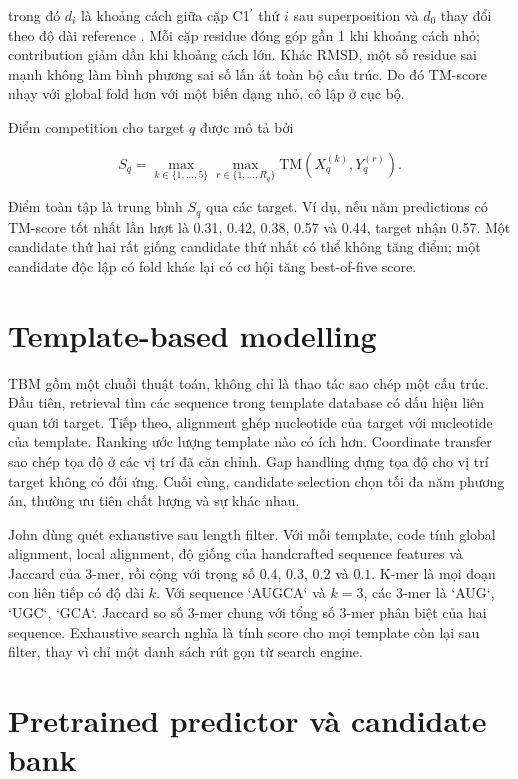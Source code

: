 \documentclass[12pt,a4paper,oneside]{report}
\newcommand{\cprime}{C1$^{\prime}$}
\begin{document}
trong đó $d_i$ là khoảng cách giữa cặp \cprime{} thứ $i$ sau superposition và
$d_0$ thay đổi theo độ dài reference \cite{tm_score,usalign}. Mỗi cặp residue đóng góp
gần 1 khi khoảng cách nhỏ; contribution giảm dần khi khoảng cách lớn. Khác RMSD, một số
residue sai mạnh không làm bình phương sai số lấn át toàn bộ cấu trúc. Do đó TM-score
nhạy với global fold hơn với một biến dạng nhỏ, cô lập ở cục bộ.

Điểm competition cho target $q$ được mô tả bởi

\begin{equation}
S_q=\max_{k\in\{1,\ldots,5\}}
\max_{r\in\{1,\ldots,R_q\}}
\mathrm{TM}\left(X_q^{(k)},Y_q^{(r)}\right).
\end{equation}

Điểm toàn tập là trung bình $S_q$ qua các target. Ví dụ, nếu năm predictions có
TM-score tốt nhất lần lượt là 0.31, 0.42, 0.38, 0.57 và 0.44, target nhận 0.57. Một
candidate thứ hai rất giống candidate thứ nhất có thể không tăng điểm; một candidate
độc lập có fold khác lại có cơ hội tăng best-of-five score.

\section{Template-based modelling}

TBM gồm một chuỗi thuật toán, không chỉ là thao tác sao chép một cấu trúc. Đầu tiên,
retrieval tìm các sequence trong template database có dấu hiệu liên quan tới target.
Tiếp theo, alignment ghép nucleotide của target với nucleotide của template. Ranking
ước lượng template nào có ích hơn. Coordinate transfer sao chép tọa độ ở các vị trí đã
căn chỉnh. Gap handling dựng tọa độ cho vị trí target không có đối ứng. Cuối cùng,
candidate selection chọn tối đa năm phương án, thường ưu tiên chất lượng và sự khác nhau.

John dùng quét exhaustive sau length filter. Với mỗi template, code tính global
alignment, local alignment, độ giống của handcrafted sequence features và Jaccard của
3-mer, rồi cộng với trọng số $0.4$, $0.3$, $0.2$ và $0.1$. K-mer là mọi đoạn con liên
tiếp có độ dài $k$. Với sequence `AUGCA` và $k=3$, các 3-mer là `AUG`, `UGC`, `GCA`.
Jaccard so số 3-mer chung với tổng số 3-mer phân biệt của hai sequence. Exhaustive
search nghĩa là tính score cho mọi template còn lại sau filter, thay vì chỉ một danh
sách rút gọn từ search engine.

\section{Pretrained predictor và candidate bank}
\end{document}
